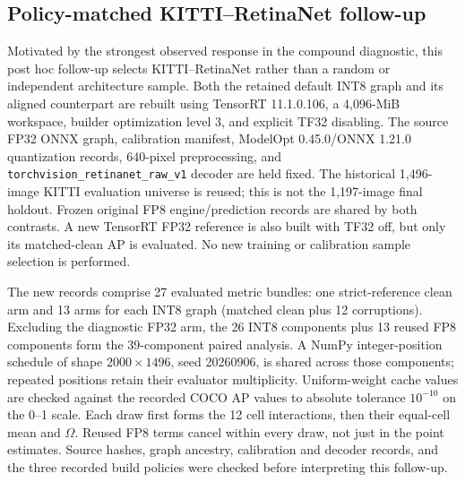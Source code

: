 \documentclass[10pt]{article}
\begin{document}
\begin{table}[htbp]
\centering\small
\caption{Absolute-accuracy guardrail for the attachment comparison. AP is on a 0--100 scale. Corrupted AP averages the same 12 cells per block. FP8 is identical under both recipes. Values come from the retained point-summary ledger, before rounding.}
\label{tab:attachment-guardrail}

\end{table}

\FloatBarrier
\subsection{Policy-matched KITTI--RetinaNet follow-up}
\label{sec:supp-controlled}

Motivated by the strongest observed response in the compound diagnostic, this
post hoc follow-up selects KITTI--RetinaNet rather than a random or independent
architecture sample. Both the retained default INT8 graph and its aligned
counterpart are rebuilt using TensorRT 11.1.0.106, a 4,096-MiB workspace,
builder optimization level 3, and explicit TF32 disabling. The source FP32
ONNX graph, calibration manifest, ModelOpt 0.45.0/ONNX 1.21.0 quantization
records, 640-pixel preprocessing, and
\texttt{torchvision\_retinanet\_raw\_v1} decoder are held fixed. The historical
1,496-image KITTI evaluation universe is reused; this is not the 1,197-image
final holdout. Frozen original FP8 engine/prediction records are shared by
both contrasts. A new TensorRT FP32 reference is also built with TF32 off,
but only its matched-clean AP is evaluated. No new training or calibration
sample selection is performed.

The new records comprise 27 evaluated metric bundles: one strict-reference
clean arm and 13 arms for each INT8 graph (matched clean plus 12 corruptions).
Excluding the diagnostic FP32 arm, the 26 INT8 components plus 13 reused
FP8 components form the 39-component paired analysis. A NumPy integer-position schedule of shape $2000\times1496$,
seed 20260906, is shared across those components; repeated positions retain
their evaluator multiplicity. Uniform-weight cache values are checked against
the recorded COCO AP values to absolute tolerance $10^{-10}$ on the 0--1
scale. Each draw first forms the 12 cell interactions, then their equal-cell
mean and $\Omega$. Reused FP8 terms cancel within every draw, not just in
the point estimates. Source hashes, graph ancestry, calibration and decoder
records, and the three recorded build policies were checked before interpreting
this follow-up.
\end{document}
